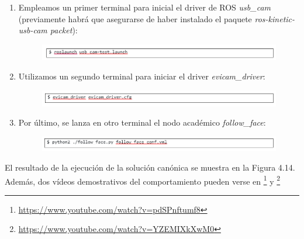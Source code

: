 \begin{enumerate}
	\item Empleamos un primer terminal para inicial el driver de ROS \textit{usb\_cam} (previamente habrá que asegurarse de haber instalado el paquete \textit{ros-kinetic-usb-cam packet}):
	\begin{figure}[H]
		\begin{center}
			\includegraphics[width=0.95\linewidth]{figures/ffcomando1.png}
			\label{fig.ffcomando1}
		\end{center}
	\end{figure}
	\item Utilizamos un segundo terminal para iniciar el driver \textit{evicam\_driver}:
	\begin{figure}[H]
		\begin{center}
			\includegraphics[width=0.95\linewidth]{figures/ffcomando2.png}
			\label{fig.ffcomando2}
		\end{center}
	\end{figure}
	\item Por último, se lanza en otro terminal el nodo académico \textit{follow\_face}:
	\begin{figure}[H]
		\begin{center}
			\includegraphics[width=0.95\linewidth]{figures/ffcomando3.png}
			\label{fig.ffcomando3}
		\end{center}
	\end{figure}
\end{enumerate}

El resultado de la ejecución de la solución canónica se muestra en la Figura 4.14. Además, dos vídeos demostrativos del comportamiento pueden verse en \footnote{\url{https://www.youtube.com/watch?v=pdSPnftumf8}} y \footnote{\url{https://www.youtube.com/watch?v=YZEMIXkXwM0}}

